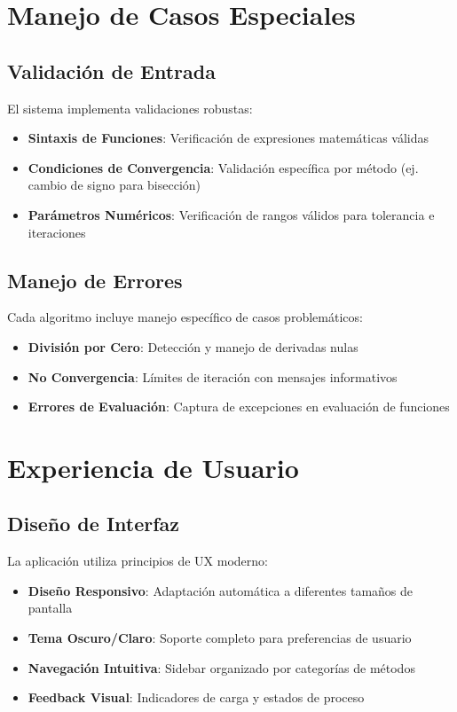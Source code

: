 \section{Manejo de Casos Especiales}

\subsection{Validación de Entrada}

El sistema implementa validaciones robustas:

\begin{itemize}
    \item \textbf{Sintaxis de Funciones}: Verificación de expresiones matemáticas válidas
    \item \textbf{Condiciones de Convergencia}: Validación específica por método (ej. cambio de signo para bisección)
    \item \textbf{Parámetros Numéricos}: Verificación de rangos válidos para tolerancia e iteraciones
\end{itemize}

\subsection{Manejo de Errores}

Cada algoritmo incluye manejo específico de casos problemáticos:

\begin{itemize}
    \item \textbf{División por Cero}: Detección y manejo de derivadas nulas
    \item \textbf{No Convergencia}: Límites de iteración con mensajes informativos
    \item \textbf{Errores de Evaluación}: Captura de excepciones en evaluación de funciones
\end{itemize}

\section{Experiencia de Usuario}

\subsection{Diseño de Interfaz}

La aplicación utiliza principios de UX moderno:

\begin{itemize}
    \item \textbf{Diseño Responsivo}: Adaptación automática a diferentes tamaños de pantalla
    \item \textbf{Tema Oscuro/Claro}: Soporte completo para preferencias de usuario
    \item \textbf{Navegación Intuitiva}: Sidebar organizado por categorías de métodos
    \item \textbf{Feedback Visual}: Indicadores de carga y estados de proceso
\end{itemize}

